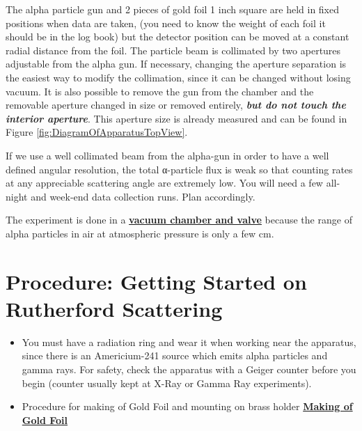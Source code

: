 \documentclass{../lab}
\begin{document}
The alpha particle gun and 2 pieces of gold foil 1 inch square are held in fixed positions when data are taken, (you need to know the weight of each foil it should be in the log book) but the detector position can be moved at a constant radial distance from the foil. The particle beam is collimated by two apertures adjustable from the alpha gun. If necessary, changing the aperture separation is the easiest way to modify the collimation, since it can be changed without losing vacuum. It is also possible to remove the gun from the chamber and the removable aperture changed in size or removed entirely, \emph{\textbf{but do not touch the interior aperture}}. This aperture size is already measured and can be found in Figure \ref{fig:DiagramOfApparatusTopView}.

If we use a well collimated beam from the alpha-gun in order to have a well defined angular resolution, the total α-particle flux is weak so that counting rates at any appreciable scattering angle are extremely low. You will need a few all-night and week-end data collection runs. Plan accordingly.

The experiment is done in a \href{http://experimentationlab.berkeley.edu/sites/default/files/images/RUT\_Chamber.jpg}{\textbf{vacuum chamber and valve}} because the range of alpha particles in air at atmospheric pressure is only a few cm.

\section{Procedure: Getting Started on Rutherford Scattering}

\begin{itemize}
    \item You must have a radiation ring and wear it when working near the apparatus, since there is an Americium-241 source which emits alpha particles and gamma rays. For safety, check the apparatus with a Geiger counter before you begin (counter usually kept at X-Ray or Gamma Ray experiments).

    \item Procedure for making of Gold Foil and mounting on brass holder \href{http://physics111.lib.berkeley.edu/Physics111/Reprints/RUT/Procedure\%20for\%20Making\%20Foils.pdf}{\textbf{Making of Gold Foil}}

\end{itemize}
\end{document}
